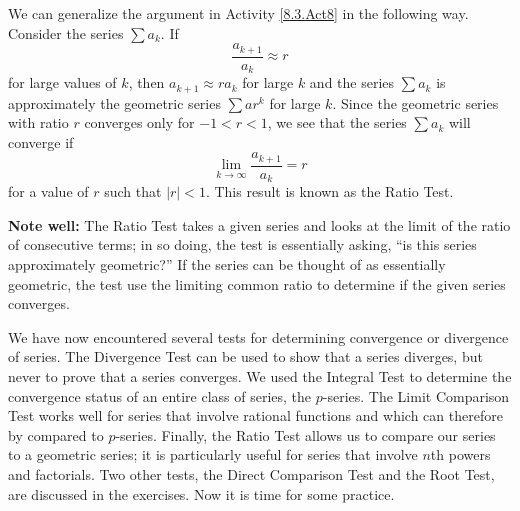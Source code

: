 

We can generalize the argument in Activity \ref{8.3.Act8} in the following way. Consider the series $ \sum a_k.$
If
\[\frac{a_{k+1}}{a_k} \approx r\]
for large values of $k$, then $a_{k+1} \approx ra_k$ for large $k$ and the series $\sum a_k$ is approximately the geometric series $\sum ar^k$ for large $k$. Since the geometric series with ratio $r$ converges only for $-1 <  r < 1$, we see that the series $ \sum a_k$
will converge if
\[\lim_{k \to \infty} \frac{a_{k+1}}{a_k} = r\]
for a value of $r$ such that $|r| < 1$. This result is known as the Ratio Test.

\vspace*{5pt}
\nin {}
\vspace*{1pt}

{\bf Note well:}  The Ratio Test takes a given series and looks at the limit of the ratio of consecutive terms; in so doing, the test is essentially asking, ``is this series approximately geometric?''  If the series can be thought of as essentially geometric, the test use the limiting common ratio to determine if the given series converges.

We have now encountered several tests for determining convergence or divergence of series. The Divergence Test can be used to show that a series diverges, but never to prove that a series converges. We used the Integral Test to determine the convergence status of an entire class of series, the $p$-series. The Limit Comparison Test works well for series that involve rational functions and which can therefore by compared to $p$-series.  Finally, the Ratio Test allows us to compare our series to a geometric series; it is particularly useful for series that involve $n$th powers and factorials.  Two other tests, the Direct Comparison Test and the Root Test, are discussed in the exercises. Now it is time for some practice.

